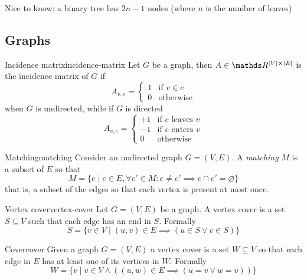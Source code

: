 \documentclass[12pt]{extarticle}
\numberwithin{equation}{subsection}
\begin{document}
Nice to know: a binary tree has $2n -1$ nodes (where $n$ is the number of leaves)

\subsection{Graphs}

\begin{definition}{Incidence matrix}{incidence-matrix}
	Let $G$ be a graph, then $A \in \R^{\abs{V} \cross \abs{E}}$ is the incidence matrix of $G$ if
	\begin{equation}
		A_{v, e} = \begin{cases}
			1 & \text{if } v \in e \\
			0 & \text{otherwise}
		\end{cases}
	\end{equation}
	when $G$ is undirected, while if $G$ is directed
	\begin{equation}
		A_{v, e} = \begin{cases}
			+1 & \text{if $e$ leaves $v$} \\
			-1 & \text{if $e$ enters $v$} \\
			0  & \text{otherwise}
		\end{cases}
	\end{equation}
\end{definition}


\begin{definition}{Matching}{matching}
	Consider an undirected graph $G = (V, E)$.
	A \emph{matching} $M$ is a subset of $E$ so that
	\begin{equation}
		M = \{ e \mid e \in E, \forall e' \in M : e \neq e' \implies e \cap e' = \varnothing \}
	\end{equation}
	that is, a subset of the edges so that each vertex is present at most once.
\end{definition}

\begin{definition}{Vertex cover}{vertex-cover}
	Let $G = (V, E)$ be a graph. A vertex cover is a set $S \subseteq V$ such that each edge has an
	end in $S$. Formally
	\begin{equation}
		S = \{ v \in V \mid (u, v) \in E \implies (u \in S \lor v \in S) \}
	\end{equation}
\end{definition}

\begin{definition}{Cover}{cover}
	Given a graph $G = (V, E)$ a vertex cover is a set $W \subseteq V$ so that each edge in
	$E$ has at least one of its vertices in $W$. Formally
	\begin{equation}
		W = \{ v \mid v \in V \land ((u, w) \in E \implies (u = v \lor w = v)) \}
	\end{equation}
\end{definition}
\end{document}
